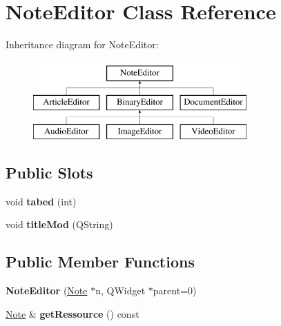 \hypertarget{classNoteEditor}{\section{\-Note\-Editor \-Class \-Reference}
\label{classNoteEditor}
}
\-Inheritance diagram for \-Note\-Editor\-:\begin{figure}[H]
\begin{center}
\leavevmode
\includegraphics[height=3.000000cm]{classNoteEditor}
\end{center}
\end{figure}
\subsection*{\-Public \-Slots}
\begin{DoxyCompactItemize}
\item 
\hypertarget{classNoteEditor_a1a4c673bba10ffabcc1ee9f51a924ce2}{void {\bfseries tabed} (int)}\label{classNoteEditor_a1a4c673bba10ffabcc1ee9f51a924ce2}

\item 
\hypertarget{classNoteEditor_a273e283bf7ffce87bda4a4dbb6bb6f00}{void {\bfseries title\-Mod} (\-Q\-String)}\label{classNoteEditor_a273e283bf7ffce87bda4a4dbb6bb6f00}

\end{DoxyCompactItemize}
\subsection*{\-Public \-Member \-Functions}
\begin{DoxyCompactItemize}
\item 
\hypertarget{classNoteEditor_a47c957c09b49e3b66d6d022cbc43eb27}{{\bfseries \-Note\-Editor} (\hyperlink{classNote}{\-Note} $\ast$n, \-Q\-Widget $\ast$parent=0)}\label{classNoteEditor_a47c957c09b49e3b66d6d022cbc43eb27}

\item 
\hypertarget{classNoteEditor_abf981dc0ad529ef84aec07b3676456ab}{\hyperlink{classNote}{\-Note} \& {\bfseries get\-Ressource} () const }\label{classNoteEditor_abf981dc0ad529ef84aec07b3676456ab}

\end{DoxyCompactItemize}
